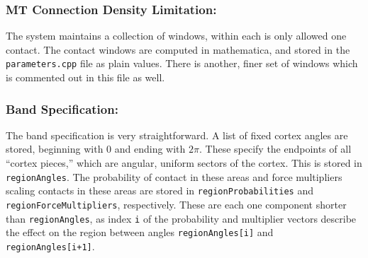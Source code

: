 \documentclass{article}
\begin{document}
\subsubsection{MT Connection Density Limitation:}
The system maintains a collection of windows, within each is only allowed one
contact. The contact windows are computed in mathematica, and stored in the
\texttt{parameters.cpp} file as plain values. There is another, finer set of
windows which is commented out in this file as well. 
\subsubsection{Band Specification:}
The band specification is very straightforward. A list of fixed cortex angles
are stored, beginning with $0$ and ending with $2\pi$. These specify the
endpoints of all ``cortex pieces,'' which are angular, uniform sectors of the
cortex. This is stored in \texttt{regionAngles}. The probability of contact in
these areas and force multipliers scaling contacts in these areas are stored in
\texttt{regionProbabilities} and \texttt{regionForceMultipliers}, respectively.
These are each one component shorter than \texttt{regionAngles}, as index
\texttt{i} of the probability and multiplier vectors describe the effect on the
region between angles \texttt{regionAngles[i]} and \texttt{regionAngles[i+1]}. 
\end{document}
